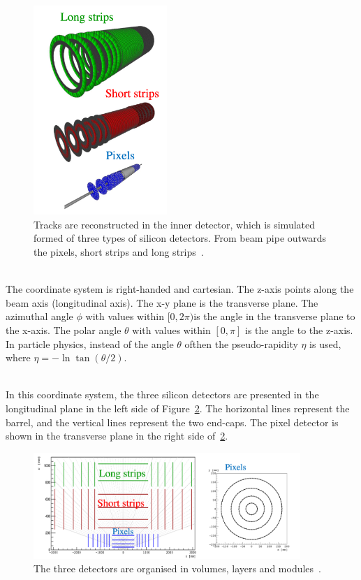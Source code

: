 \begin{figure}[htb]
\centering
\includegraphics[width=0.45\textwidth]{./plots/ThreeSiDetectors.png}
\caption{Tracks are reconstructed in the inner detector, which is simulated formed of three types of silicon detectors. From beam pipe outwards the pixels, short strips and long strips~\cite{TrackMLPPTBefore}.}
\label{fig:ThreeSiDetectors}
\end{figure}

\ \\The coordinate system is right-handed and cartesian. The z-axis points along the beam axis (longitudinal axis). The x-y plane is the transverse plane. The azimuthal angle $\phi$ with values within $[0, 2\pi) $is the angle in the transverse plane to the x-axis. The polar angle $\theta$ with values within $[0, \pi]$ is the angle to the z-axis. In particle physics, instead of the angle $\theta$ ofthen the pseudo-rapidity $\eta$ is used, where $\eta = -\ln \tan (\theta/2)$. 

\ \\In this coordinate system, the three silicon detectors are presented in the longitudinal plane in the left side of Figure~\ref{fig:DetectorGeometry}. The horizontal lines represent the barrel, and the vertical lines represent the two end-caps. The pixel detector is shown in the transverse plane in the right side of~\ref{fig:DetectorGeometry}. 

\begin{figure}[hbt]
\centering
\includegraphics[width=0.9\textwidth]{./plots/DetectorGeometry.png}
\caption{The three detectors are organised in volumes, layers and modules~\cite{TrackMLPPTBefore}.}
\label{fig:DetectorGeometry}
\end{figure}

